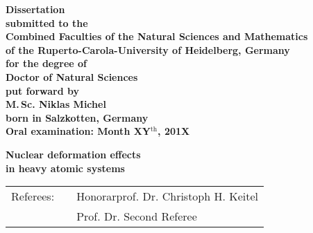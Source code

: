 
\begin{titlepage}
\begin{center}
  \renewcommand{\baselinestretch}{1.50}
  \normalsize\bfseries%
  Dissertation\\
  submitted to the\\
  Combined Faculties of the Natural Sciences and Mathematics\\
  of the Ruperto-Carola-University of Heidelberg, Germany\\
  for the degree of\\
  Doctor of Natural Sciences\\
  \vfill
  put forward by\\
  \vspace{0.5\baselineskip}
  {\Large M.$\,$Sc. Niklas Michel} \\
  \vspace{0.5\baselineskip}
  born in Salzkotten, Germany\\
  Oral examination: Month XY$^{\textrm{th}}$, 201X
\end{center}
\end{titlepage}





\begin{titlepage}
\begin{center}
  \renewcommand{\baselinestretch}{1.50}
  \vspace*{1.5\baselineskip}
  \bfseries
  {\Huge Nuclear deformation effects}\\%
   \vspace{0.7\baselineskip} {\Huge in heavy atomic systems}
  \vfill
  \large%
  \begin{tabular}{lp{0.5cm}l}
  Referees: && Honorarprof. Dr. Christoph H. Keitel\\
  && Prof. Dr. Second Referee%
  \end{tabular}
\end{center}
\end{titlepage}

\renewcommand{\baselinestretch}{1.00}\normalsize


